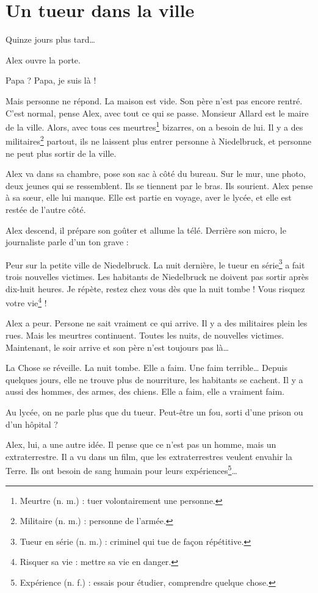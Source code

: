 \chapter{Un tueur dans la ville}
Quinze jours plus tard\ldots{}

Alex ouvre la porte.

\og Papa ? Papa, je suis là ! \fg{}

Mais personne ne répond. La maison est vide. Son père n'est pas encore rentré. C'est normal, pense Alex, avec tout ce qui se
passe. Monsieur Allard est le maire de la ville. Alors, avec tous ces meurtres\footnote{Meurtre (n. m.) : tuer volontairement une
personne.} bizarres, on a besoin de lui. Il y a des militaires\footnote{Militaire (n. m.) : personne de l'armée.} partout, ils ne
laissent plus entrer personne à Niedelbruck, et personne ne peut plus sortir de la ville.

Alex va dans sa chambre, pose son sac à côté du bureau. Sur le mur, une photo, deux jeunes qui se ressemblent. Ils se tiennent par
le bras. Ils sourient. Alex pense à sa s\oe{}ur, elle lui manque. Elle est partie en voyage, aver le lycée, et elle est restée de
l'autre côté.

Alex descend, il prépare son goûter et allume la télé. Derrière son micro, le journaliste parle d'un ton grave :

\og Peur sur la petite ville de Niedelbruck. La nuit dernière, le tueur en série\footnote{Tueur en série (n. m.) : criminel qui tue
de fa\c{c}on répétitive.} a fait trois nouvelles victimes. Les habitants de Niedelbruck ne doivent pas sortir après dix-huit
heures. Je répète, restez chez vous dès que la nuit tombe ! Vous risquez votre vie\footnote{Risquer sa vie : mettre sa vie en
danger.} ! \fg{}

Alex a peur. Persone ne sait vraiment ce qui arrive. Il y a des militaires plein les rues. Mais les meurtres continuent. Toutes
les nuits, de nouvelles victimes. Maintenant, le soir arrive et son père n'est toujours pas là\ldots{}

La Chose se réveille. La nuit tombe. Elle a faim. Une faim terrible\ldots{} Depuis quelques jours, elle ne trouve plus de
nourriture, les habitants se cachent. Il y a aussi des hommes, des armes, des chiens. Elle a faim, elle a vraiment faim.

Au lycée, on ne parle plus que du tueur. Peut-être un fou, sorti d'une prison ou d'un hôpital ?

Alex, lui, a une autre idée. Il pense que ce n'est pas un homme, mais un extraterrestre. Il a vu dans un film, que les
extraterrestres veulent envahir la Terre. Ils ont besoin de sang humain pour leurs expériences\footnote{Expérience (n. f.) :
essais pour étudier, comprendre quelque chose.}\ldots{}

